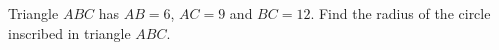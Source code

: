 Triangle $ABC$ has $AB=6$, $AC=9$ and $BC=12$. Find the radius of the circle inscribed in triangle $ABC$.
